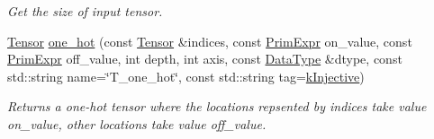 \begin{DoxyCompactItemize}
\begin{DoxyCompactList}\small\item\em Get the size of input tensor. \end{DoxyCompactList}\item 
\hyperlink{classtvm_1_1te_1_1Tensor}{Tensor} \hyperlink{namespacetopi_a08d4963de8afe8fdb543c012066537a9}{one\+\_\+hot} (const \hyperlink{classtvm_1_1te_1_1Tensor}{Tensor} \&indices, const \hyperlink{classtvm_1_1PrimExpr}{Prim\+Expr} on\+\_\+value, const \hyperlink{classtvm_1_1PrimExpr}{Prim\+Expr} off\+\_\+value, int depth, int axis, const \hyperlink{namespacetvm_a41918af1a1dc386388639a9d3ad06c5d}{Data\+Type} \&dtype, const std\+::string name=\char`\"{}T\+\_\+one\+\_\+hot\char`\"{}, const std\+::string tag=\hyperlink{namespacetopi_a60f05ec416e4618d25ad00dd9f536934}{k\+Injective})
\begin{DoxyCompactList}\small\item\em Returns a one-\/hot tensor where the locations repsented by indices take value on\+\_\+value, other locations take value off\+\_\+value. \end{DoxyCompactList}\end{DoxyCompactItemize}
